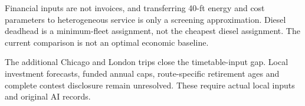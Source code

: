 Financial inputs are not invoices, and transferring 40-ft energy and cost parameters to heterogeneous service is only a screening approximation. Diesel deadhead is a minimum-fleet assignment, not the cheapest diesel assignment. The current comparison is not an optimal economic baseline.


The additional Chicago and London trips close the timetable-input gap. Local investment forecasts, funded annual caps, route-specific retirement ages and complete contest disclosure remain unresolved. These require actual local inputs and original AI records.

